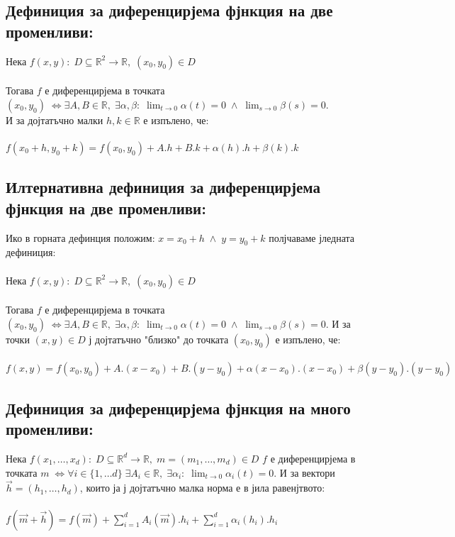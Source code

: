 \documentclass[14pt]{extarticle}
\newcommand{\R}{\mathbb{R}}
\newcommand{\Sum}{\displaystyle\sum}
\newcommand{\Lim}[2]{\displaystyle\lim_{#1 \to #2}}
\newcommand{\Vector}[1]{\overrightarrow{#1}}
\begin{document}
\subsection*{Дефиниция за диференцирјема фјнкция на две променливи:}
Нека \(f(x, y) : \; D \subseteq \R^2 \to \R, \; (x_0, y_0) \in D \) \\\\
Тогава \(f\) е диференцирјема в точката \((x_0, y_0) \; \iff \exists A, B \in \R, \;
\exists \alpha, \beta : \; \Lim{t}{0} \alpha(t) = 0 \; \land \; \Lim{s}{0} \beta(s) = 0 \). \\
И за дојтатъчно малки \(h, k \in \R\) е изпълено, че: \\\\
\(f(x_0 + h,y_0 + k) = f(x_0, y_0) + A.h + B.k + \alpha(h).h + \beta(k).k\)
\subsection*{Илтернативна дефиниция за диференцирјема фјнкция на две променливи:}
Ико в горната дефинция положим: \(x = x_0 + h \; \land \; y = y_0 + k\) полјчаваме јледната дефиниция: \\\\
Нека \(f(x, y) : \; D \subseteq \R^2 \to \R, \; (x_0, y_0) \in D \) \\\\
Тогава \(f\) е диференцирјема в точката \((x_0, y_0) \; \iff \exists A, B \in \R, \;
\exists \alpha, \beta : \; \Lim{t}{0} \alpha(t) = 0 \; \land \; \Lim{s}{0} \beta(s) = 0 \). И за точки \((x, y) \in D\) ј дојтатъчно "близко" до точката \((x_0, y_0)\) е изпълено, че: \\\\
\(f(x,y) = f(x_0, y_0) + A.(x - x_0) + B.(y - y_0) + \alpha(x - x_0).(x - x_0) + \beta(y - y_0).(y - y_0)\)
\subsection*{Дефиниция за диференцирјема фјнкция на много променливи:}
Нека \(f(x_1, \dots, x_d) : \; D \subseteq \R^d \to \R, \; m = (m_1, \dots, m_d) \in D \) \(f\) е диференцирјема в точката \(m \; \iff
\forall i \in \{1, \dots d\} \; \exists A_i \in \R, \; \exists \alpha_i : \; \Lim{t}{0} \alpha_i(t) = 0 \). И за вектори \(\Vector{h} = (h_1, \dots, h_d)\), които ја ј дојтатъчно малка норма е в јила равенјтвото: \\\\
\(f(\Vector{m} + \Vector{h}) = f(\Vector{m}) + \Sum_{i = 1}^d A_i(\Vector{m}).h_i + \Sum_{i = 1}^d \alpha_{i}(h_i).h_i \)
\end{document}
